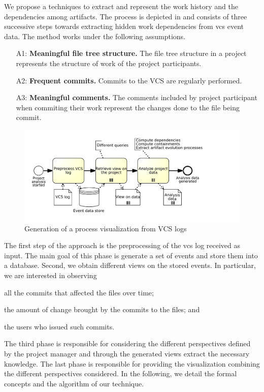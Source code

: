 We propose a techniques to extract and represent the work history and the dependencies among artifacts. The process is depicted in  and consists of three successive steps towards extracting hidden work dependencies from \gls{vcs} event data. The method works under the following assumptions.

\begin{itemize}
\item [A1:] {\bf Meaningful file tree structure.} The file tree structure in a project represents the structure of work of the project participants.
\item [A2:] {\bf Frequent commits.} Commits to the VCS are regularly performed.  
\item [A3:] {\bf Meaningful comments.} The comments included by project participant when commiting their work represent the changes done to the file being commit.
\end{itemize}

\begin{figure}[h]
\centering
\includegraphics[width=.8\textwidth]{figures/visualization-process}
\caption[Generation of a process visualization from VCS logs]{Generation of a process visualization from VCS logs}
\label{fig:visualization-process}
\end{figure}

The first step of the approach is the preprocessing of the \gls{vcs} log received as input. The main goal of this phase is generate a set of events and store them into a database. Second, we obtain different views on the stored events. In particular, we are interested in observing
\begin{inparaenum}[\itshape i)]
	\item all the commits that affected the files over time;
	\item the amount of change brought by the commits to the files; and
	\item the users who issued such commits.
\end{inparaenum}
The third phase is responsible for considering the different perspectives defined by the project manager and through the generated views extract the necessary knowledge. The last phase is responsible for providing the visualization combining the different perspectives considered. In the following, we detail the formal concepts and the algorithm of our technique.


